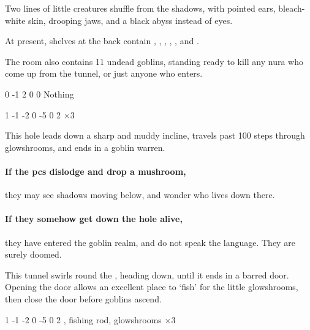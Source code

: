 \begin{multicols}{2}
\begin{boxtext}
  Two lines of little creatures shuffle from the shadows, with pointed ears, bleach-white skin, drooping jaws, and a black abyss instead of eyes.
\end{boxtext}

At present, shelves at the back contain \lootMedium, \lootJewellery, \lootJewellery, \lootJewellery, \lootJewellery, and \lootBig.

The room also contains 11 undead goblins, standing ready to kill any nura who come up from the tunnel, or just anyone who enters.

  {0}%
  {-1}%
  {2}%
  {0}%
  {0}%
  {}%
  {Nothing}%
  {
    \undead
  }

  {1}%
  {-1}%
  {{-2}%
  {0}%
  {-5}}%
  {0}%
  {2}%
  {}%
  {\javelin $\times 3$}%
  {
    \setcounter{Projectiles}{1}
    \setcounter{Caving}{2}
    \setcounter{Tactics}{1}
    \undead
  }


This hole leads down a sharp and muddy incline, travels past 100 \glspl{step} through glowshrooms, and ends in a goblin warren.

\paragraph{If the \glspl{pc} dislodge and drop a mushroom,}
they may see shadows moving below, and wonder who lives down there.

\paragraph{If they somehow get down the hole alive,}
they have entered the goblin realm, and do not speak the language.
They are surely doomed.


\begin{exampletext}
  This tunnel swirls round the , heading down, until it ends in a barred door.
  Opening the door allows an excellent place to `fish' for the little glowshrooms, then close the door before goblins ascend.
\end{exampletext}

  {1}%
  {-1}%
  {{-2}%
  {0}%
  {-5}}%
  {0}%
  {2}%
  {}%
  {\javelin, fishing rod, glowshrooms $\times 3$}%
  {
    \setcounter{Projectiles}{1}
    \setcounter{Caving}{2}
    \setcounter{Tactics}{1}
    \undead
  }


\end{multicols}
